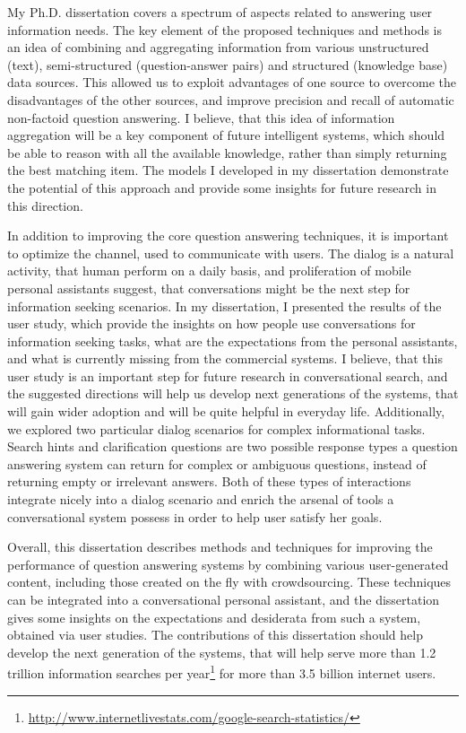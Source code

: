My Ph.D. dissertation covers a spectrum of aspects related to answering user information needs.
The key element of the proposed techniques and methods is an idea of combining and aggregating information from various unstructured (text), semi-structured (question-answer pairs) and structured (knowledge base) data sources.
This allowed us to exploit advantages of one source to overcome the disadvantages of the other sources, and improve precision and recall of automatic non-factoid question answering.
I believe, that this idea of information aggregation will be a key component of future intelligent systems, which should be able to reason with all the available knowledge, rather than simply returning the best matching item.
The models I developed in my dissertation demonstrate the potential of this approach and provide some insights for future research in this direction.

In addition to improving the core question answering techniques, it is important to optimize the channel, used to communicate with users.
The dialog is a natural activity, that human perform on a daily basis, and proliferation of mobile personal assistants suggest, that conversations might be the next step for information seeking scenarios.
In my dissertation, I presented the results of the user study, which provide the insights on how people use conversations for information seeking tasks, what are the expectations from the personal assistants, and what is currently missing from the commercial systems.
I believe, that this user study is an important step for future research in conversational search, and the suggested directions will help us develop next generations of the systems, that will gain wider adoption and will be quite helpful in everyday life.
Additionally, we explored two particular dialog scenarios for complex informational tasks.
Search hints and clarification questions are two possible response types a question answering system can return for complex or ambiguous questions, instead of returning empty or irrelevant answers.
Both of these types of interactions integrate nicely into a dialog scenario and enrich the arsenal of tools a conversational system possess in order to help user satisfy her goals.

Overall, this dissertation describes methods and techniques for improving the performance of question answering systems by combining various user-generated content, including those created on the fly with crowdsourcing.
These techniques can be integrated into a conversational personal assistant, and the dissertation gives some insights on the expectations and desiderata from such a system, obtained via user studies.
The contributions of this dissertation should help develop the next generation of the systems, that will help serve more than 1.2 trillion information searches per year\footnote{\href{url}{http://www.internetlivestats.com/google-search-statistics/}} for more than 3.5 billion internet users.


